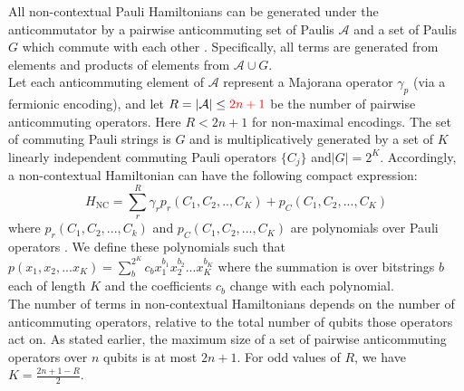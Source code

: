 \documentclass[%
 aip,
 amsmath,amssymb,
 reprint,%
]{revtex4-1}
\newcommand{\noncontextualHamiltonian}{H_{\mathrm{NC}}}
\newcommand{\kLinIndepComm}{K}           %
\newcommand{\kLinIndepAnti}{R}           %
\begin{document}
All non-contextual Pauli Hamiltonians can be generated under the anticommutator by a pairwise anticommuting set of Paulis $\mathcal{A}$ and a set of Paulis $G$ which commute with each other %
    \cite{Ralli_ContextPauli, patel2023extensionexactlysolvablehamiltoniansusing}. Specifically, all terms are generated from elements and products of elements from $\mathcal{A}\cup G$. \\
\indent Let each anticommuting element of $\mathcal{A}$ represent a Majorana operator $\gamma_p$ (via a fermionic encoding), and  let $\kLinIndepAnti=|\mathcal{A}|\leq {\color{red} 2n+1}$ be the number of pairwise anticommuting operators. Here $R<2n+1$ for non-maximal encodings. The set of commuting Pauli strings is $G$ and is multiplicatively generated by a set of $\kLinIndepComm$ linearly independent commuting Pauli operators $\{C_j\}$ and$|G|=2^\kLinIndepComm$. Accordingly, a non-contextual Hamiltonian can have the following compact expression:
\begin{equation}
    \noncontextualHamiltonian = \sum_r^\kLinIndepAnti \gamma_r p_r (C_1, C_2, .., C_{\kLinIndepComm}) + p_C(C_1, C_2, ..., C_{\kLinIndepComm})
    \label{eq:noncontextual-hamiltonian}
\end{equation}
where $p_r(C_1, C_2, ..., C_{k})$ and $ p_C(C_1, C_2, ..., C_{\kLinIndepComm})$ are polynomials over Pauli operators \cite{patel2023extensionexactlysolvablehamiltoniansusing}. We define these polynomials such that $p(x_1,x_2,...x_K) =\sum_b^{2^K} c_b x_1^{b_1} x_2 ^{b_2} ... x_{\kLinIndepComm} ^{b_{\kLinIndepComm}}$ where the summation is over bitstrings $b$ each of length $\kLinIndepComm$ and the coefficients $c_b$ change with each polynomial.\\ 
\indent The number of terms in non-contextual Hamiltonians depends on the number of anticommuting operators, relative to the total number of qubits those operators act on. As stated earlier, the maximum size of a set of pairwise anticommuting operators over $n$ qubits is at most $2n+1$. %
For odd values of $R$, we have $K = \frac{2n+1-R}{2}$. 

\end{document}
